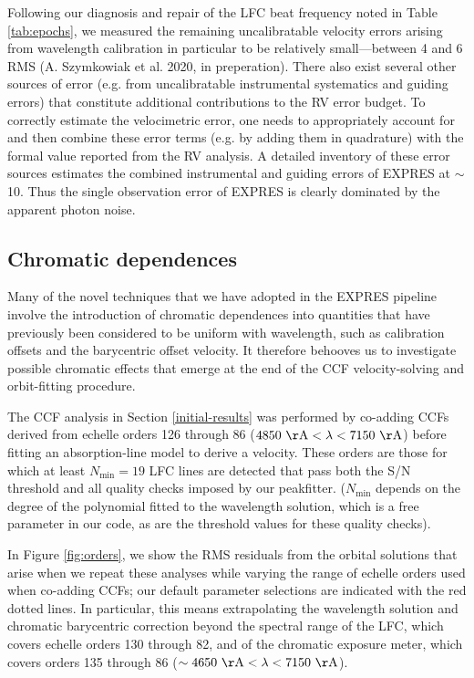 Following our diagnosis and repair of the LFC beat frequency noted in Table \ref{tab:epochs}, we measured the remaining uncalibratable velocity errors arising from wavelength calibration in particular to be relatively small---between 4 and 6\cms{} RMS (A. Szymkowiak et al. 2020, in preperation). There also exist several other sources of error (e.g. from uncalibratable instrumental systematics and guiding errors) that constitute additional contributions to the RV error budget. To correctly estimate the velocimetric error, one needs to appropriately account for and then combine these error terms (e.g. by adding them in quadrature) with the formal value reported from the RV analysis. A detailed inventory of these error sources \citep{blackman_performance_2020} estimates the combined instrumental and guiding errors of EXPRES at $\sim$10\cms. Thus the single observation error of EXPRES is clearly dominated by the apparent photon noise.

\hypertarget{ccf-order-selection}{%
\subsection{Chromatic dependences}\label{ccf-order-selection}}

Many of the novel techniques that we have adopted in the EXPRES pipeline involve the introduction of chromatic dependences into quantities that have previously been considered to be uniform with wavelength, such as calibration offsets and the barycentric offset velocity. It therefore behooves us to investigate possible chromatic effects that emerge at the end of the CCF velocity-solving and orbit-fitting procedure.

The CCF analysis in Section \ref{initial-results} was performed by co-adding CCFs derived from echelle orders 126 through 86 ($4850\unit{\AA}<\lambda<7150\unit{\AA}$) before fitting an absorption-line model to derive a velocity. These orders are those for which at least $N_\text{min}=19$ LFC lines are detected that pass both the S/N threshold and all quality checks imposed by our peakfitter. ($N_\text{min}$ depends on the degree of the polynomial fitted to the wavelength solution, which is a free parameter in our code, as are the threshold values for these quality checks).

In Figure \ref{fig:orders}, we show the RMS residuals from the orbital solutions that arise when we repeat these analyses while varying the range of echelle orders used when co-adding CCFs; our default parameter selections are indicated with the red dotted lines. In particular, this means extrapolating the wavelength solution and chromatic barycentric correction beyond the spectral range of the LFC, which covers echelle orders 130 through 82, and of the chromatic exposure meter, which covers orders 135 through 86 ($\sim4650\unit{\AA}<\lambda<7150\unit{\AA}$).

